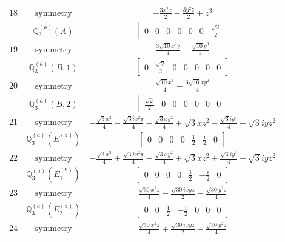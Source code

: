 \documentclass[fleqn,8pt,landscape]{jsarticle}
\begin{document}
\begin{longtable}{ccc}
$ 18 $ & $ \text{symmetry} $ & $ - \frac{3 x^{2} z}{2} - \frac{3 y^{2} z}{2} + z^{3} $ \\
$  $ & $ \mathbb{Q}_{3}^{(a)}(A) $ & $ \begin{bmatrix} 0 & 0 & 0 & 0 & 0 & 0 & \frac{\sqrt{2}}{2} \end{bmatrix} $ \\ \hline
$ 19 $ & $ \text{symmetry} $ & $ \frac{3 \sqrt{10} x^{2} y}{4} - \frac{\sqrt{10} y^{3}}{4} $ \\
$  $ & $ \mathbb{Q}_{3}^{(a)}(B,1) $ & $ \begin{bmatrix} 0 & \frac{\sqrt{2}}{2} & 0 & 0 & 0 & 0 & 0 \end{bmatrix} $ \\ \hline
$ 20 $ & $ \text{symmetry} $ & $ \frac{\sqrt{10} x^{3}}{4} - \frac{3 \sqrt{10} x y^{2}}{4} $ \\
$  $ & $ \mathbb{Q}_{3}^{(a)}(B,2) $ & $ \begin{bmatrix} \frac{\sqrt{2}}{2} & 0 & 0 & 0 & 0 & 0 & 0 \end{bmatrix} $ \\ \hline
$ 21 $ & $ \text{symmetry} $ & $ - \frac{\sqrt{3} x^{3}}{4} - \frac{\sqrt{3} i x^{2} y}{4} - \frac{\sqrt{3} x y^{2}}{4} + \sqrt{3} x z^{2} - \frac{\sqrt{3} i y^{3}}{4} + \sqrt{3} i y z^{2} $ \\
$  $ & $ \mathbb{Q}_{3}^{(a)}(E_{1}^{(a)}) $ & $ \begin{bmatrix} 0 & 0 & 0 & 0 & \frac{1}{2} & \frac{i}{2} & 0 \end{bmatrix} $ \\ \hline
$ 22 $ & $ \text{symmetry} $ & $ - \frac{\sqrt{3} x^{3}}{4} + \frac{\sqrt{3} i x^{2} y}{4} - \frac{\sqrt{3} x y^{2}}{4} + \sqrt{3} x z^{2} + \frac{\sqrt{3} i y^{3}}{4} - \sqrt{3} i y z^{2} $ \\
$  $ & $ \mathbb{Q}_{3}^{(a)}(E_{1}^{(b)}) $ & $ \begin{bmatrix} 0 & 0 & 0 & 0 & \frac{1}{2} & - \frac{i}{2} & 0 \end{bmatrix} $ \\ \hline
$ 23 $ & $ \text{symmetry} $ & $ \frac{\sqrt{30} x^{2} z}{4} - \frac{\sqrt{30} i x y z}{2} - \frac{\sqrt{30} y^{2} z}{4} $ \\
$  $ & $ \mathbb{Q}_{3}^{(a)}(E_{2}^{(a)}) $ & $ \begin{bmatrix} 0 & 0 & \frac{1}{2} & - \frac{i}{2} & 0 & 0 & 0 \end{bmatrix} $ \\ \hline
$ 24 $ & $ \text{symmetry} $ & $ \frac{\sqrt{30} x^{2} z}{4} + \frac{\sqrt{30} i x y z}{2} - \frac{\sqrt{30} y^{2} z}{4} $ \\

\end{longtable}
\end{document}
